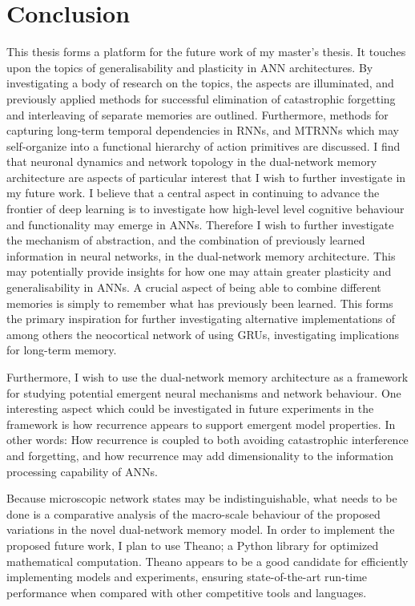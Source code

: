 \section{Conclusion}

This thesis forms a platform for the future work of my master's thesis. It touches upon the topics of generalisability and plasticity in ANN architectures. By investigating a body of research on the topics, the aspects are illuminated, and previously applied methods for successful elimination of catastrophic forgetting and interleaving of separate memories are outlined. Furthermore, methods for capturing long-term temporal dependencies in RNNs, and MTRNNs which may self-organize into a functional hierarchy of action primitives are discussed. 
I find that neuronal dynamics and network topology in the dual-network memory architecture are aspects of particular interest that I wish to further investigate in my future work. 
I believe that a central aspect in continuing to advance the frontier of deep learning is to investigate how high-level level cognitive behaviour and functionality may emerge in ANNs. Therefore I wish to further investigate the mechanism of abstraction, and the combination of previously learned information in neural networks, in the dual-network memory architecture. This may potentially provide insights for how one may attain greater plasticity and generalisability in ANNs. 
A crucial aspect of being able to combine different memories is simply to remember what has previously been learned. This forms the primary inspiration for further investigating alternative implementations of among others the neocortical network of \cite{Hattori2014} using GRUs, investigating implications for long-term memory.

Furthermore, I wish to use the dual-network memory architecture as a framework for studying potential emergent neural mechanisms and network behaviour.
One interesting aspect which could be investigated in future experiments in the framework is how recurrence appears to support emergent model properties. In other words: How recurrence is coupled to both avoiding catastrophic interference and forgetting, and how recurrence may add dimensionality to the information processing capability of ANNs.

Because microscopic network states may be indistinguishable, what needs to be done is a comparative analysis of the macro-scale behaviour of the proposed variations in the novel dual-network memory model. In order to implement the proposed future work, I plan to use Theano; a Python library for optimized mathematical computation. Theano appears to be a good candidate for efficiently implementing models and experiments, ensuring state-of-the-art run-time performance when compared with other competitive tools and languages.

\cleardoublepage
